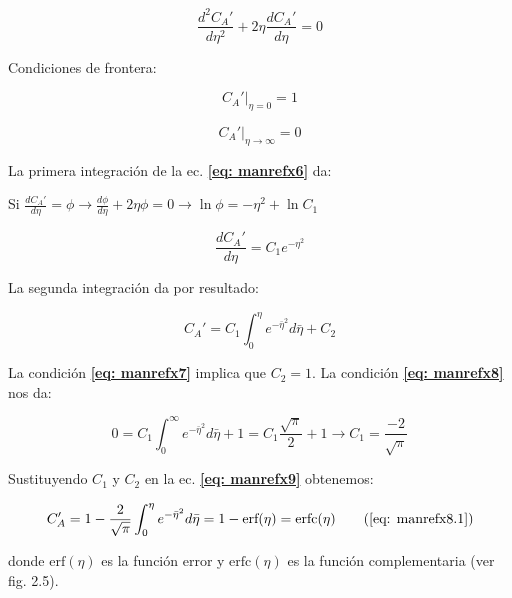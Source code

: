 \begin{equation} \label{eq: manrefx6}
	\frac{d^2 C_A'}{d \eta^2} + 2\eta \frac{d C_A'}{d \eta} = 0
\end{equation}

Condiciones de frontera:

\begin{equation} \label{eq: manrefx7}
	C_A'|_{\eta = 0} = 1
\end{equation}

\begin{equation} \label{eq: manrefx8}
	C_A'|_{\eta \to \infty} = 0
\end{equation}

La primera integración de la ec. \textbf{\eqref{eq: manrefx6}} da:

Si $\frac{d C_A'}{d \eta} = \phi \to \frac{d\phi}{d \eta} + 2 \eta \phi = 0 \to \ln{\phi} = -\eta^2 + \ln{C_1}$

\begin{equation} \label{eq: manrefx8.1}
	\frac{dC_A'}{d \eta} = C_1 e^{-\eta^2}
\end{equation}

La segunda integración da por resultado:

\begin{equation} \label{eq: manrefx9}
	C_A' = C_1 \int_0^\eta e^{-\bar{\eta}^2} d\bar{\eta} + C_2
\end{equation}

La condición \textbf{\eqref{eq: manrefx7}} implica que $C_2 = 1$. La condición \textbf{\eqref{eq: manrefx8}} nos da:

$$0 = C_1 \int_0^\infty e^{-\bar{\eta}^2} d\bar{\eta} +1 = C_1 \frac{\sqrt{\pi}}{2} + 1 \to C_1 = \frac{-2}{\sqrt{\pi}}$$

Sustituyendo $C_1$ y $C_2$ en la ec. \textbf{\eqref{eq: manrefx9}} obtenemos: 

\begin{equation}
C_A' = 1 - \frac{2}{\sqrt{\pi}} \int_0^\eta e^{-\bar{\eta}^2} d\bar{\eta} = 1 - \text{erf} (\eta) = \text{erfc}(\eta) 
\tag{\eqref{eq: manrefx8.1}}
\end{equation}

 donde $\text{erf} (\eta)$ es la función error y $\text{erfc}(\eta)$ es la función complementaria (ver fig. 2.5).
 
